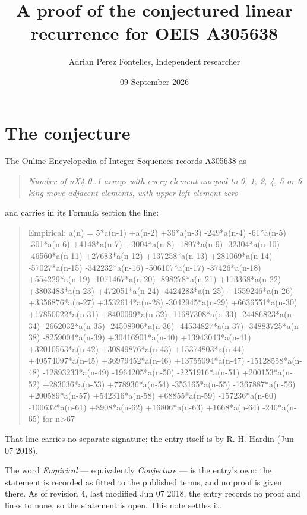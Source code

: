 \documentclass[11pt]{article}
\title{A proof of the conjectured linear recurrence for OEIS A305638}
\author{Adrian Perez Fontelles, Independent researcher}
\date{09 September 2026}
\theoremstyle{definition}
\begin{document}
\maketitle
\section{The conjecture}

The Online Encyclopedia of Integer Sequences records \href{https://oeis.org/A305638}{A305638} as

\begin{quote}\itshape Number of nX4 0..1 arrays with every element unequal to 0, 1, 2, 4, 5 or 6 king-move adjacent elements, with upper left element zero\end{quote}

and carries in its Formula section the line:

\begin{quote}\ttfamily Empirical: a(n) = 5*a(n-1) +a(n-2) +36*a(n-3) -249*a(n-4) -61*a(n-5) -301*a(n-6) +4148*a(n-7) +3004*a(n-8) -1897*a(n-9) -32304*a(n-10) -46560*a(n-11) +27683*a(n-12) +137258*a(n-13) +281069*a(n-14) -57027*a(n-15) -342232*a(n-16) -506107*a(n-17) -37426*a(n-18) +554229*a(n-19) -1071467*a(n-20) -898278*a(n-21) +113368*a(n-22) +3803483*a(n-23) +472051*a(n-24) -4424283*a(n-25) +1559246*a(n-26) +3356876*a(n-27) +3532614*a(n-28) -3042945*a(n-29) +6636551*a(n-30) +17850022*a(n-31) +8400099*a(n-32) -11687308*a(n-33) -24486823*a(n-34) -2662032*a(n-35) -24508906*a(n-36) -44534827*a(n-37) -34883725*a(n-38) -8259004*a(n-39) +30416901*a(n-40) +13943043*a(n-41) +32010563*a(n-42) +30849876*a(n-43) +15374803*a(n-44) +40574097*a(n-45) +36979452*a(n-46) +13755094*a(n-47) -15128558*a(n-48) -12893233*a(n-49) -1964205*a(n-50) -2251916*a(n-51) +200153*a(n-52) +283036*a(n-53) +778936*a(n-54) -353165*a(n-55) -1367887*a(n-56) +200589*a(n-57) +542316*a(n-58) +68855*a(n-59) -157236*a(n-60) -100632*a(n-61) +8908*a(n-62) +16806*a(n-63) +1668*a(n-64) -240*a(n-65) for n>67\end{quote}

That line carries no separate signature; the entry itself is by R. H. Hardin (Jun 07 2018).

The word {\itshape Empirical} --- equivalently {\itshape Conjecture} --- is the entry's own: the statement is recorded as fitted to the published terms, and no proof is given there. As of revision 4, last modified Jun 07 2018, the entry records no proof and links to none, so the statement is open. This note settles it.
\end{document}
